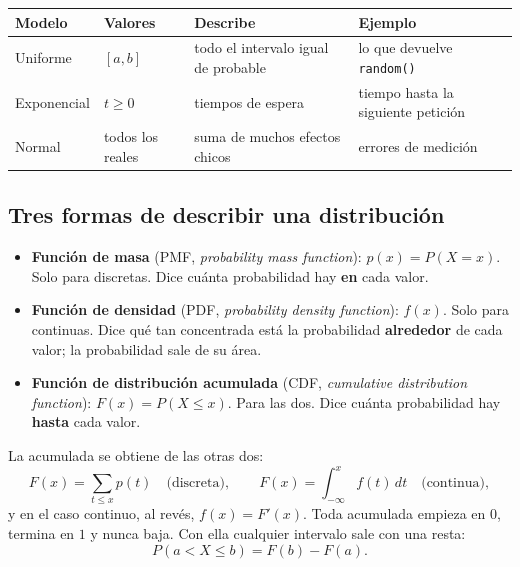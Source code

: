 \documentclass[11pt,letterpaper]{article}
\begin{document}
\begin{center}
\small
\begin{tabular}{llll}
    \toprule
    \textbf{Modelo} & \textbf{Valores} & \textbf{Describe}
    & \textbf{Ejemplo} \\
    \midrule
    Uniforme    & $[a, b]$      & todo el intervalo igual de probable
                & lo que devuelve \texttt{random()} \\
    Exponencial & $t \ge 0$     & tiempos de espera
                & tiempo hasta la siguiente petición \\
    Normal      & todos los reales & suma de muchos efectos chicos
                & errores de medición \\
    \bottomrule
\end{tabular}
\end{center}


\subsection*{Tres formas de describir una distribución}

\begin{itemize}[itemsep=0.3em]
    \item \textbf{Función de masa} (PMF, \textit{probability mass
          function}): $p(x) = P(X = x)$. Solo para discretas. Dice
          cuánta probabilidad hay \textbf{en} cada valor.
    \item \textbf{Función de densidad} (PDF, \textit{probability
          density function}): $f(x)$. Solo para continuas. Dice qué tan
          concentrada está la probabilidad \textbf{alrededor} de cada
          valor; la probabilidad sale de su área.
    \item \textbf{Función de distribución acumulada} (CDF,
          \textit{cumulative distribution function}):
          $F(x) = P(X \le x)$. Para las dos. Dice cuánta probabilidad
          hay \textbf{hasta} cada valor.
\end{itemize}

La acumulada se obtiene de las otras dos:
\[
    F(x) = \sum_{t \le x} p(t) \quad \text{(discreta)} ,
    \qquad
    F(x) = \int_{-\infty}^{x} f(t)\, dt \quad \text{(continua)} ,
\]
y en el caso continuo, al revés, $f(x) = F'(x)$. Toda acumulada empieza
en $0$, termina en $1$ y nunca baja. Con ella cualquier intervalo sale
con una resta:
\[
    P(a < X \le b) = F(b) - F(a) .
\]
\end{document}
